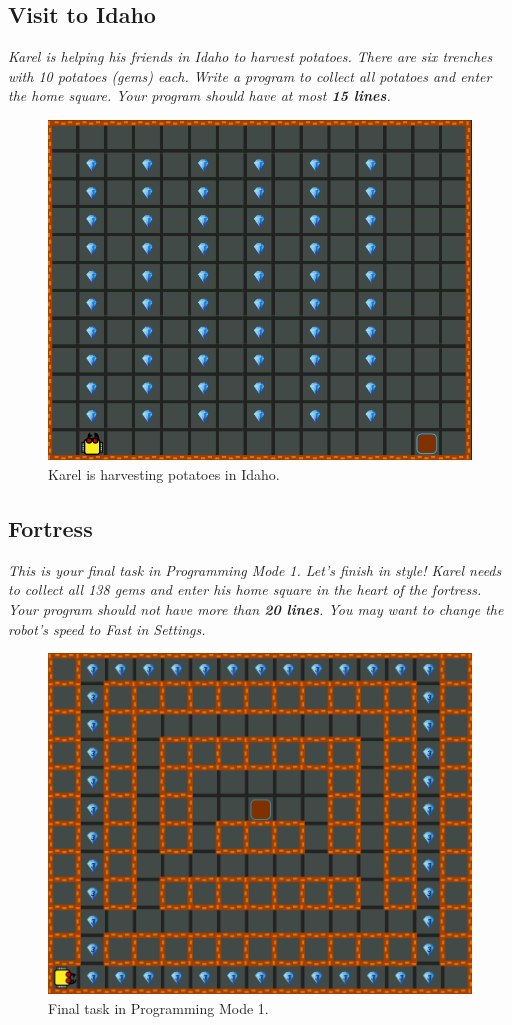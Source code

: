 \newpage

\subsection{Visit to Idaho}

{\em Karel is helping his friends in Idaho to harvest potatoes. There are six trenches with 10 potatoes (gems) each. Write a program to collect all potatoes and enter the home square. Your program should have at most {\bf 15 lines}.}\\[-7mm]

\begin{figure}[!ht]
\begin{center}
\includegraphics[height=0.4\textwidth]{img/c03.png}
\end{center}
\vspace{-4mm}
\caption{Karel is harvesting potatoes in Idaho.}
\label{fig:c03}
\vspace{-10mm}
\end{figure}
\noindent

\subsection{Fortress}

{\em This is your final task in Programming Mode 1. Let's finish in style! Karel needs to collect all 138 gems and enter his home square in the heart of the fortress. Your program should not have more than {\bf 20 lines}. You may want to change the robot's speed to Fast in Settings.}\\[-9mm]

\begin{figure}[!ht]
\begin{center}
\includegraphics[height=0.4\textwidth]{img/a28.png}
\end{center}
\vspace{-5mm}
\caption{Final task in Programming Mode 1.}
\label{fig:a28}
\vspace{-10mm}
\end{figure}

